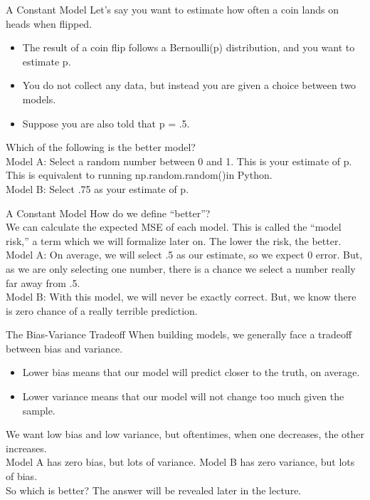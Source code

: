 \documentclass[aspectratio=169]{../latex_main/tntbeamer}  %
\begin{document}
	
		\begin{frame}{A Constant Model}
	    Let’s say you want to estimate how often a coin lands on heads when flipped.
	    \begin{itemize}
	        \item The result of a coin flip follows a Bernoulli(p) distribution, and you want to estimate p.
	        \item You do not collect any data, but instead you are given a choice between two models.
	        \item Suppose you are also told that p = .5.
	    \end{itemize}
	    Which of the following is the better model?\\
	    \bigskip
	    Model A: Select a random number between 0 and 1. This is your estimate of p. This is equivalent to running np.random.random()in Python.\\
	    \bigskip
	    Model B: Select .75 as your estimate of p.
	\end{frame}
	
	
	\begin{frame}{A Constant Model}
	   How do we define “better”?\\
	   \bigskip
	    We can calculate the expected MSE of each model. This is called the “model risk,” a term which we will formalize later on. The lower the risk, the better.\\
	    \bigskip
	    Model A: On average, we will select .5 as our estimate, so we expect 0 error. But, as we are only selecting one number, there is a chance we select a number really far away from .5.\\
	    \bigskip
	    Model B: With this model, we will never be exactly correct. But, we know there is zero chance of a really terrible prediction.
	\end{frame}
	
	
	\begin{frame}[c]{The Bias-Variance Tradeoff}
	   When building models, we generally face a tradeoff between bias and variance.
	   \begin{itemize}
	       \item Lower bias means that our model will predict closer to the truth, on average.
	       \item Lower variance means that our model will not change too much given the sample.
	   \end{itemize}
	   \bigskip
	   We want low bias and low variance, but oftentimes, when one decreases, the other increases.\\
	   Model A has zero bias, but lots of variance. Model B has zero variance, but lots of bias.\\
	   \bigskip
	   So which is better? The answer will be revealed later in the lecture.
	\end{frame}
	
\end{document}
